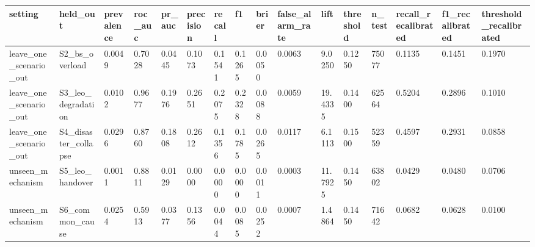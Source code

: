 \begin{tabular}{llllllllllllllll}
\toprule
setting & held\_out & prevalence & roc\_auc & pr\_auc & precision & recall & f1 & brier & false\_alarm\_rate & lift & threshold & n\_test & recall\_recalibrated & f1\_recalibrated & threshold\_recalibrated \\
\midrule
leave\_one\_scenario\_out & S2\_bs\_overload & 0.0049 & 0.7028 & 0.0445 & 0.1073 & 0.1541 & 0.1265 & 0.0050 & 0.0063 & 9.0250 & 0.1250 & 75077 & 0.1135 & 0.1451 & 0.1970 \\
leave\_one\_scenario\_out & S3\_leo\_degradation & 0.0102 & 0.9677 & 0.1976 & 0.2651 & 0.2075 & 0.2328 & 0.0088 & 0.0059 & 19.4335 & 0.1400 & 62564 & 0.5204 & 0.2896 & 0.1010 \\
leave\_one\_scenario\_out & S4\_disaster\_collapse & 0.0296 & 0.8760 & 0.1808 & 0.2612 & 0.1356 & 0.1785 & 0.0265 & 0.0117 & 6.1113 & 0.1500 & 52359 & 0.4597 & 0.2931 & 0.0858 \\
unseen\_mechanism & S5\_leo\_handover & 0.0011 & 0.8811 & 0.0129 & 0.0000 & 0.0000 & 0.0000 & 0.0011 & 0.0003 & 11.7925 & 0.1450 & 63802 & 0.0429 & 0.0480 & 0.0706 \\
unseen\_mechanism & S6\_common\_cause & 0.0254 & 0.5913 & 0.0377 & 0.1356 & 0.0044 & 0.0085 & 0.0252 & 0.0007 & 1.4864 & 0.1450 & 71642 & 0.0682 & 0.0628 & 0.0100 \\
\bottomrule
\end{tabular}
